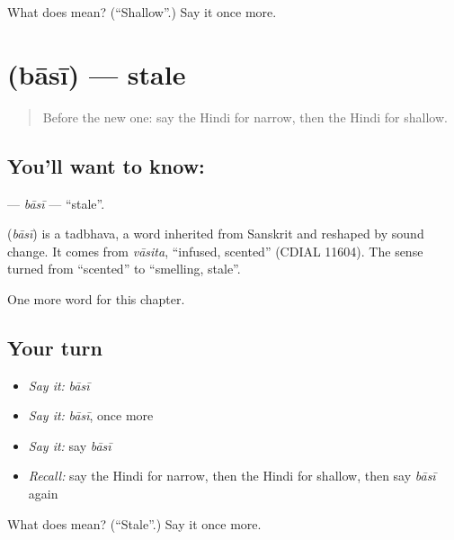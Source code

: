 \begin{tcolorbox}[breakable,colback=teal!4,colframe=teal!35!black,title={Before you move on}]
What does  mean? (\textquotedblleft{}Shallow\textquotedblright{}.) Say it once more.
\end{tcolorbox}
\section[\texorpdfstring{\hi{बासी} (bāsī)}{बासी (bāsī)}]{ (bāsī) — stale}

\label{lesson:HI-C237-basi}



\begin{quote}
Before the new one: say the Hindi for narrow, then the Hindi for shallow.
\end{quote}

\subsection*{You'll want to know: }
\textbf{} — \emph{bāsī} — \textquotedblleft{}stale\textquotedblright{}.

\begin{cousinweb}
\textbf{} (\emph{bāsī}) is a tadbhava, a word inherited from Sanskrit and reshaped by sound change. It comes from \emph{vāsita}, \textquotedblleft{}infused, scented\textquotedblright{} (CDIAL 11604). The sense turned from \textquotedblleft{}scented\textquotedblright{} to \textquotedblleft{}smelling, stale\textquotedblright{}.
\end{cousinweb}

\begin{grammarlens}[title={What you've built}]
One more word for this chapter.
\end{grammarlens}

\subsection*{Your turn}
\begin{itemize}
\raggedright
  \item \emph{Say it:} \emph{bāsī}
  \item \emph{Say it:} \emph{bāsī}, once more
  \item \emph{Say it:} say \emph{bāsī}
  \item \emph{Recall:} say the Hindi for narrow, then the Hindi for shallow, then say \emph{bāsī} again
\end{itemize}

\begin{tcolorbox}[breakable,colback=teal!4,colframe=teal!35!black,title={Before you move on}]
What does  mean? (\textquotedblleft{}Stale\textquotedblright{}.) Say it once more.
\end{tcolorbox}
